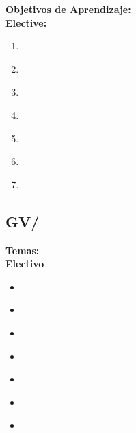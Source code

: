 \noindent \textbf{Objetivos de Aprendizaje:}\\
\noindent \textbf{Elective:}
\begin{enumerate}
	\setcounter{enumi}{0}
	\item \GVComputerAnimationLOComputeTheOrientation\xspace[\GVComputerAnimationLOComputeTheOrientationLevel]\label{sec:BOK:GVComputerAnimationLOComputeTheOrientation}
	\item \GVComputerAnimationLOComputeTheArticulated\xspace[\GVComputerAnimationLOComputeTheArticulatedLevel]\label{sec:BOK:GVComputerAnimationLOComputeTheArticulated}
	\item \GVComputerAnimationLODescribeTheDifferent\xspace[\GVComputerAnimationLODescribeTheDifferentLevel]\label{sec:BOK:GVComputerAnimationLODescribeTheDifferent}
	\item \GVComputerAnimationLOImplementThe\xspace[\GVComputerAnimationLOImplementTheLevel]\label{sec:BOK:GVComputerAnimationLOImplementThe}
	\item \GVComputerAnimationLOImplementAlgorithmsModeling\xspace[\GVComputerAnimationLOImplementAlgorithmsModelingLevel]\label{sec:BOK:GVComputerAnimationLOImplementAlgorithmsModeling}
	\item \GVComputerAnimationLODiscussTheBehind\xspace[\GVComputerAnimationLODiscussTheBehindLevel]\label{sec:BOK:GVComputerAnimationLODiscussTheBehind}
	\item \GVComputerAnimationLOUseCommon\xspace[\GVComputerAnimationLOUseCommonLevel]\label{sec:BOK:GVComputerAnimationLOUseCommon}
\end{enumerate}


\subsection{GV/\GVVisualization}\label{sec:BOK:GVVisualization}
\noindent \textbf{Temas:}\\
\noindent \textbf{Electivo}
\begin{itemize}
	\item \GVVisualizationTopicVisualization\label{sec:BOK:GVVisualizationTopicVisualization}
	\item \GVVisualizationTopicDirect\label{sec:BOK:GVVisualizationTopicDirect}
	\item \GVVisualizationTopicVisualizationOf\label{sec:BOK:GVVisualizationTopicVisualizationOf}
	\item \GVVisualizationTopicPerceptual\label{sec:BOK:GVVisualizationTopicPerceptual}
	\item \GVVisualizationTopicVisualizationDesign\label{sec:BOK:GVVisualizationTopicVisualizationDesign}
	\item \GVVisualizationTopicEvaluation\label{sec:BOK:GVVisualizationTopicEvaluation}
	\item \GVVisualizationTopicApplications\label{sec:BOK:GVVisualizationTopicApplications}
\end{itemize}


